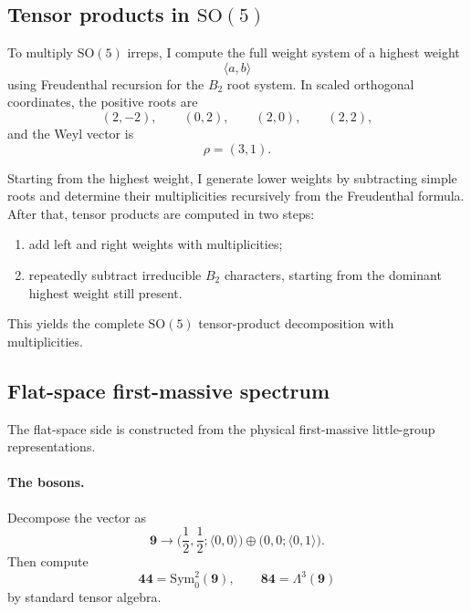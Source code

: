 \documentclass[12pt]{article}
\newcommand{\SO}{\mathrm{SO}}
\newcommand{\la}{\langle}
\newcommand{\ra}{\rangle}
\newcommand{\bb}{\mathbf}
\newcommand{\half}{\frac{1}{2}}
\begin{document}
\subsection{Tensor products in \texorpdfstring{$\SO(5)$}{SO(5)}}

To multiply $\SO(5)$ irreps, I compute the full weight system of a highest weight
\begin{equation}
\la a,b\ra
\end{equation}
using Freudenthal recursion for the $B_2$ root system. In scaled orthogonal coordinates,
the positive roots are
\begin{equation}
(2,-2),\qquad (0,2),\qquad (2,0),\qquad (2,2),
\end{equation}
and the Weyl vector is
\begin{equation}
\rho=(3,1).
\end{equation}

Starting from the highest weight, I generate lower weights by subtracting simple roots and
determine their multiplicities recursively from the Freudenthal formula. After that, tensor
products are computed in two steps:
\begin{enumerate}
\item add left and right weights with multiplicities;
\item repeatedly subtract irreducible $B_2$ characters, starting from the dominant highest weight
still present.
\end{enumerate}
This yields the complete $\SO(5)$ tensor-product decomposition with multiplicities.

\subsection{Flat-space first-massive spectrum}

The flat-space side is constructed from the physical first-massive little-group representations.

\paragraph{The bosons.}
Decompose the vector as
\begin{equation}
\bb 9\to \Big(\half,\half;\la 0,0\ra\Big)\oplus \Big(0,0;\la 0,1\ra\Big).
\end{equation}
Then compute
\begin{equation}
\bb{44}=\mathrm{Sym}^2_0(\bb 9),\qquad \bb{84}=\Lambda^3(\bb 9)
\end{equation}
by standard tensor algebra.
\end{document}
